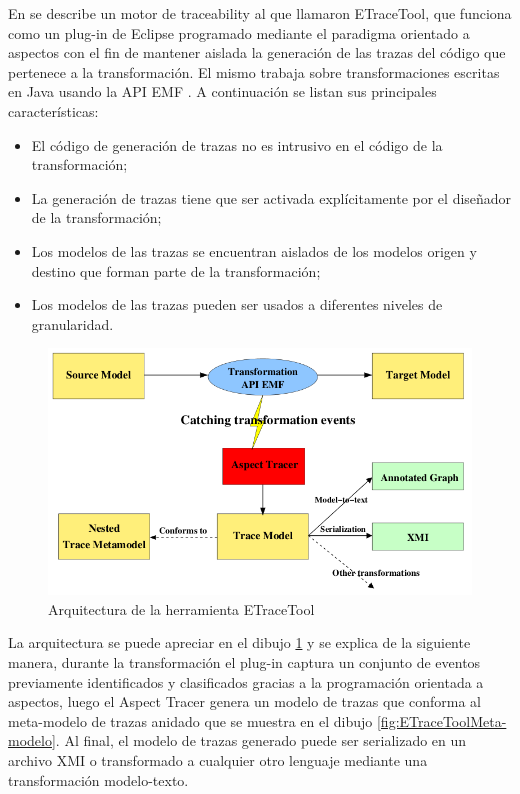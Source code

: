 \documentclass[a4paper,12pt,oneside]{book}
\begin{document}
En \cite{AmarLeblancCoulette} se describe un motor de traceability al que llamaron ETraceTool, que funciona como un plug-in de Eclipse programado mediante el paradigma orientado a aspectos con el fin de mantener aislada la generación de las trazas del código que pertenece a la transformación. El mismo trabaja sobre transformaciones escritas en Java usando la API EMF \cite{EMF}. A continuación se listan sus principales características:

\begin{itemize}
\item     El código de generación de trazas no es intrusivo en el código de la transformación;
\item    La generación de trazas tiene que ser activada explícitamente por el diseñador de la transformación;
\item    Los modelos de las trazas se encuentran aislados de los modelos origen y destino que forman parte de la transformación;
\item    Los modelos de las trazas pueden ser usados a diferentes niveles de granularidad.
\end{itemize}

\begin{figure}[hbtp]
\centering
\includegraphics[scale=0.5]{./img/ETraceTool_Arquitectura}
\caption{Arquitectura de la herramienta ETraceTool}
\label{fig:ArqETraceTool}
\end{figure}

La arquitectura se puede apreciar en el dibujo \ref{fig:ArqETraceTool} y se explica de la siguiente manera, durante la transformación el plug-in captura un conjunto de eventos previamente identificados y clasificados gracias a la programación orientada a aspectos, luego el Aspect Tracer genera un modelo de trazas que conforma al meta-modelo de trazas anidado que se muestra en el dibujo \ref{fig:ETraceToolMeta-modelo}. Al final, el modelo de trazas generado puede ser serializado en un archivo XMI o transformado a cualquier otro lenguaje mediante una transformación modelo-texto.
\end{document}
